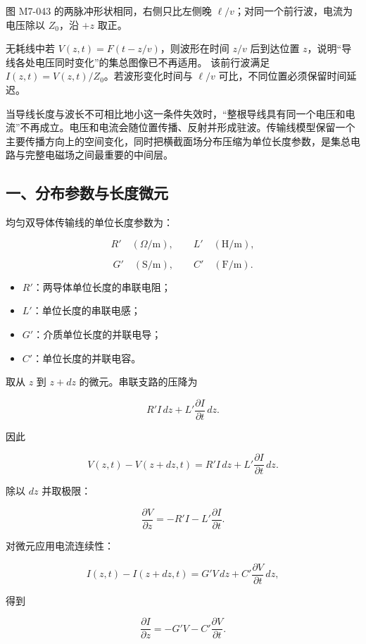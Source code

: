 图 M7-043 的两脉冲形状相同，右侧只比左侧晚
\(\ell/v\)；对同一个前行波，电流为电压除以 \(Z_0\)，沿 \(+z\) 取正。

无耗线中若 \(V(z,t)=F(t-z/v)\)，则波形在时间 \(z/v\) 后到达位置
\(z\)，说明``导线各处电压同时变化''的集总图像已不再适用。 该前行波满足
\(I(z,t)=V(z,t)/Z_0\)。若波形变化时间与 \(\ell/v\)
可比，不同位置必须保留时间延迟。

当导线长度与波长不可相比地小这一条件失效时，``整根导线具有同一个电压和电流''不再成立。电压和电流会随位置传播、反射并形成驻波。传输线模型保留一个主要传播方向上的空间变化，同时把横截面场分布压缩为单位长度参数，是集总电路与完整电磁场之间最重要的中间层。

\subsection{一、分布参数与长度微元}\label{m7:ux4e00ux5206ux5e03ux53c2ux6570ux4e0eux957fux5ea6ux5faeux5143}

均匀双导体传输线的单位长度参数为：

\[
R'\quad(\Omega/\mathrm m),
\qquad
L'\quad(\mathrm H/\mathrm m),
\]

\[
G'\quad(\mathrm S/\mathrm m),
\qquad
C'\quad(\mathrm F/\mathrm m).
\]

\begin{itemize}
\tightlist
\item
  \(R'\)：两导体单位长度的串联电阻；
\item
  \(L'\)：单位长度的串联电感；
\item
  \(G'\)：介质单位长度的并联电导；
\item
  \(C'\)：单位长度的并联电容。
\end{itemize}

取从 \(z\) 到 \(z+dz\) 的微元。串联支路的压降为

\[
R'I\,dz+L'\frac{\partial I}{\partial t}\,dz.
\]

因此

\[
V(z,t)-V(z+dz,t)
=R'I\,dz+L'\frac{\partial I}{\partial t}\,dz.
\]

除以 \(dz\) 并取极限：

\[
\boxed{
\frac{\partial V}{\partial z}
=-R'I-L'\frac{\partial I}{\partial t}
}.
\]

对微元应用电流连续性：

\[
I(z,t)-I(z+dz,t)
=G'V\,dz+C'\frac{\partial V}{\partial t}\,dz,
\]

得到

\[
\boxed{
\frac{\partial I}{\partial z}
=-G'V-C'\frac{\partial V}{\partial t}
}.
\]

